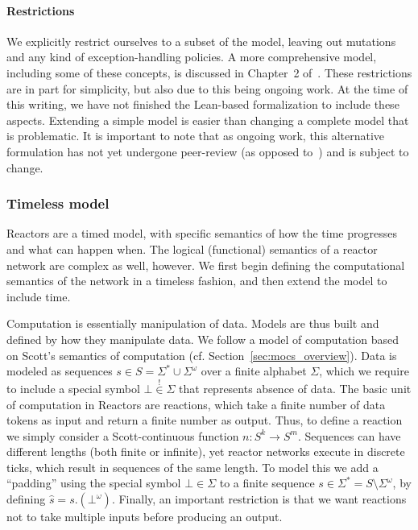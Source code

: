\paragraph{Restrictions}

We explicitly restrict ourselves to a subset of the model, leaving out mutations and any kind of exception-handling policies.
A more comprehensive model, including some of these concepts, is discussed in Chapter~2 of~\cite{lohstroh_phdthesis}.
These restrictions are in part for simplicity, but also due to this being ongoing work.
At the time of this writing, we have not finished the Lean-based formalization to include these aspects.
Extending a simple model is easier than changing a complete model that is problematic.
It is important to note that as ongoing work, this alternative formulation has not yet undergone peer-review (as opposed to~\cite{lohstroh_cyphy19}) and is subject to change.

\subsubsection{Timeless model}

Reactors are a timed model, with specific semantics of how the time progresses and what can happen when.
The logical (functional) semantics of a reactor network are complex as well, however.
We first begin defining the computational semantics of the network in a timeless fashion, and then extend the model to include time.

Computation is essentially manipulation of data.
Models are thus built and defined by how they manipulate data.
We follow a model of computation based on Scott's semantics of computation (cf. Section~\ref{sec:mocs_overview}).
Data is modeled as sequences $s \in S = \Sigma^* \cup \Sigma^\omega$ over a finite alphabet $\Sigma$, which we require to include a special symbol $\bot \overset{!}{\in} \Sigma$ that represents absence of data.
The basic unit of computation in Reactors are reactions, which take a finite number of data tokens as input and return a finite number as output.
Thus, to define a reaction we simply consider a Scott-continuous function $n : S^k \rightarrow S^m$.
Sequences can have different lengths (both finite or infinite), yet reactor networks execute in discrete ticks, which result in sequences of the same length.
To model this we add a ``padding'' using the special symbol $\bot \in \Sigma$ to a finite sequence $s \in \Sigma^* = S \setminus \Sigma^\omega$, by defining $\hat s  = s.(\bot^\omega)$. 
Finally, an important restriction is that we want reactions not to take multiple inputs before producing an output. 

